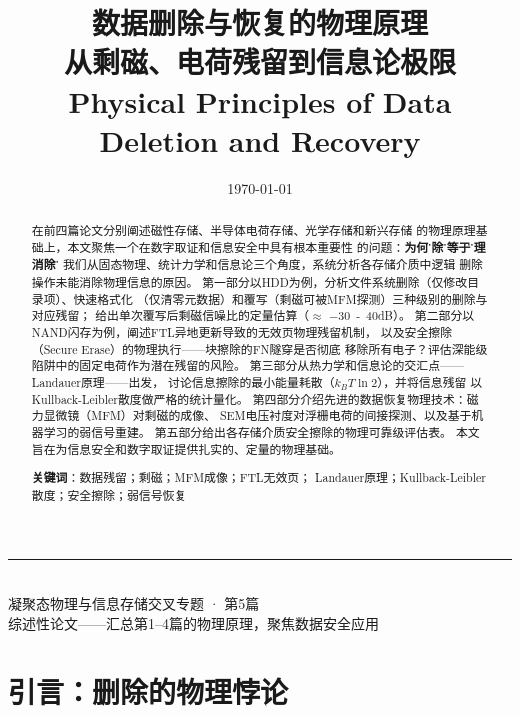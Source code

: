 \documentclass[11pt,a4paper,twoside]{article}
\theoremstyle{definition}\newtheorem{definition}{定义}[section]
\theoremstyle{plain}\newtheorem{theorem}{定理}[section]
\theoremstyle{remark}\newtheorem{remark}{注解}[section]
\begin{document}
\title{{\Huge\bfseries 数据删除与恢复的物理原理}\\[8pt]
       {\Large 从剩磁、电荷残留到信息论极限}\\[12pt]
       {\normalsize Physical Principles of Data Deletion and Recovery}}
\author{}\date{\today}
\maketitle

\begin{center}\rule{0.8\textwidth}{0.5pt}\\[8pt]
{\small 凝聚态物理与信息存储交叉专题 · 第5篇}\\[4pt]
{\small 综述性论文——汇总第1--4篇的物理原理，聚焦数据安全应用}
\end{center}

\begin{abstract}
\noindent
在前四篇论文分别阐述磁性存储、半导体电荷存储、光学存储和新兴存储
的物理原理基础上，本文聚焦一个在数字取证和信息安全中具有根本重要性
的问题：\textbf{为何\"删除\"不等于\"物理消除\"？}
我们从固态物理、统计力学和信息论三个角度，系统分析各存储介质中逻辑
删除操作未能消除物理信息的原因。
第一部分以HDD为例，分析文件系统删除（仅修改目录项）、快速格式化
（仅清零元数据）和覆写（剩磁可被MFM探测）三种级别的删除与对应残留；
给出单次覆写后剩磁信噪比的定量估算（$\approx$ \SI{-30}{-40}{dB}）。
第二部分以NAND闪存为例，阐述FTL异地更新导致的无效页物理残留机制，
以及安全擦除（Secure Erase）的物理执行——块擦除的FN隧穿是否彻底
移除所有电子？评估深能级陷阱中的固定电荷作为潜在残留的风险。
第三部分从热力学和信息论的交汇点——Landauer原理——出发，
讨论信息擦除的最小能量耗散（$k_B T \ln 2$），并将信息残留
以Kullback-Leibler散度做严格的统计量化。
第四部分介绍先进的数据恢复物理技术：磁力显微镜（MFM）对剩磁的成像、
SEM电压衬度对浮栅电荷的间接探测、以及基于机器学习的弱信号重建。
第五部分给出各存储介质安全擦除的物理可靠级评估表。
本文旨在为信息安全和数字取证提供扎实的、定量的物理基础。

\medskip
\noindent\textbf{关键词}：数据残留；剩磁；MFM成像；FTL无效页；
Landauer原理；Kullback-Leibler散度；安全擦除；弱信号恢复
\end{abstract}

\tableofcontents\newpage

\section{引言：删除的物理悖论}
\label{sec:intro}
\end{document}
